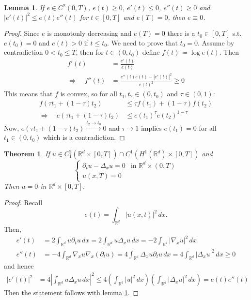 \documentclass{report}
\theoremstyle{tommy}
\newtheorem{thm}[defn]{Theorem}
\newtheorem{lem}[defn]{Lemma}
\begin{document}
  \begin{lem}\label{e-becomes-zero}
		If \(e \in C^2(0,T)\), \(e(t) \ge 0\), \(e'(t) \le 0\), \(e''(t) \ge 0\) and \(|e'(t)|^2 \le e(t) e''(t)\) for \(t \in [0,T]\) and \(e(T) = 0\), then \(e \equiv 0\).
	\end{lem}

	\begin{proof}
		Since \(e\) is monotonly decreasing and \(e(T) = 0\) there is a \(t_0 \in [0,T]\) s.t. \(e(t_0) = 0\) and \(e(t) > 0\) if \(t \le t_0\). We need to prove that \(t_0 = 0\). Assume by contradiction \(0 < t_0 \le T\), then for \(t \in (0,t_0)\) define \(f(t) \coloneqq \log e(t)\). Then 
		\begin{align*}
			f'(t) &= \frac{e'(t)}{e(t)} \\
			\Rightarrow \quad f''(t) &= \frac{e''(t) e(t)-|e'(t)|^2}{e(t)^2} \ge 0
		\end{align*}
		This means that \(f\) is convex, so for all \(t_1, t_2 \in (0,t_0)\) and \(\tau \in (0,1)\):
		\begin{align*}
			f(\tau t_1 + (1-\tau)t_2) &\le \tau f(t_1) + (1-\tau)f(t_2) \\
			\Rightarrow \quad e(\tau t_1 + (1-\tau) t_2) &\le e(t_1)^\tau e(t_2)^{1-\tau}
		\end{align*}
		Now, \(e(\tau t_1 + (1-\tau) t_2) \xrightarrow{t_2 \to t_0} 0\) and \(\tau \to 1\) implies \(e(t_1) = 0\) for all \(t_1 \in (0,t_0)\) which is a contradiction.
	\end{proof}

  \begin{thm}
    If \(u \in C_1^2(\mathbb{R}^d \times [0,T]) \cap C^1(H^1(\mathbb{R}^d) \times [0,T])\) and 
    \[\begin{cases}
      \partial_t u - \Delta_x u = 0 & \text{in } \mathbb{R}^d \times (0,T) \\
      u(x,T) = 0
    \end{cases}\]
    Then \(u = 0\) in \(\mathbb{R}^d \times [0,T]\).
  \end{thm}

  \begin{proof}
    Recall 
	\[e(t) = \int_{\mathbb{R}^d} |u(x,t)|^2 \, dx.\]
	Then,
	\begin{align*}
		e'(t) &= 2 \int_{\mathbb{R}^d} u \partial_t u \, dx
		= 2 \int_{\mathbb{R}^d} u \Delta_x u \, dx
		= -2\int_{\mathbb{R}^d} |\nabla_x u|^2 \, dx \\
		e''(t) &= - 4 \int_{\mathbb{R}^d} \nabla_x u \nabla_x(\partial_t u) 
		= 4 \int_{\mathbb{R}^d} \Delta_x u \partial_t u \, dx
		= 4 \int_{\mathbb{R}^d}|\Delta_x u|^2 \, dx \ge 0
	\end{align*}
	and hence
	\begin{align*}
		|e'(t)|^2 &= 4 \left| \int_{\mathbb{R}^d} u \Delta_x u \, dx \right|^2 
		\le 4 \left(\int_{\mathbb{R}^d} |u|^2 \, dx\right) \left(\int_{\mathbb{R}^d} |\Delta_x u|^2 \, dx\right) = e(t) e''(t)
	\end{align*}
	Then the statement follows with lemma \ref{e-becomes-zero}.
  \end{proof}
\end{document}
